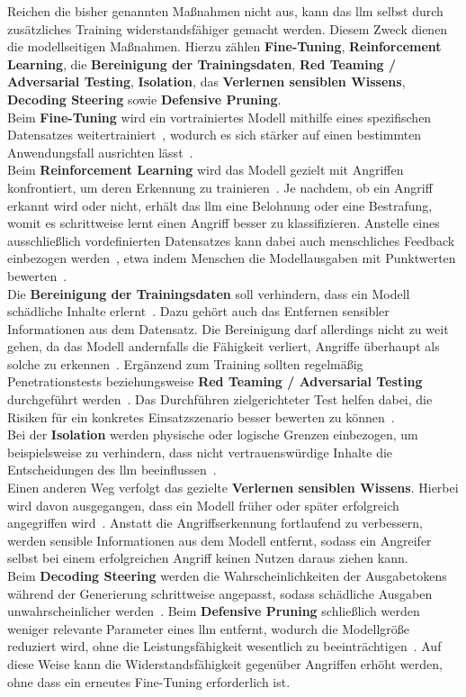 Reichen die bisher genannten Maßnahmen nicht aus, kann das \ac{llm} selbst durch zusätzliches Training widerstandsfähiger gemacht werden. Diesem Zweck dienen die
modellseitigen Maßnahmen. Hierzu zählen \textbf{Fine-Tuning}, \textbf{Reinforcement Learning}, die \textbf{Bereinigung der Trainingsdaten}, \textbf{Red Teaming / Adversarial Testing},
\textbf{Isolation}, das \textbf{Verlernen sensiblen Wissens}, \textbf{Decoding Steering} sowie \textbf{Defensive Pruning}. \\
Beim \textbf{Fine-Tuning} wird ein vortrainiertes Modell mithilfe eines spezifischen Datensatzes weitertrainiert~\cite{sm14}, wodurch es sich stärker auf einen bestimmten
Anwendungsfall ausrichten lässt~\cite[7]{sm09}. \\
Beim \textbf{Reinforcement Learning} wird das Modell gezielt mit Angriffen konfrontiert, um deren Erkennung zu trainieren~\cite{sm07}. Je nachdem, ob ein Angriff erkannt wird
oder nicht, erhält das \ac{llm} eine Belohnung oder eine Bestrafung, womit es schrittweise lernt einen Angriff besser zu klassifizieren.
Anstelle eines ausschließlich vordefinierten Datensatzes kann dabei auch menschliches Feedback
einbezogen werden~\cite{sm04}, etwa indem Menschen die Modellausgaben mit Punktwerten bewerten~\cite[8]{sm10}. \\
Die \textbf{Bereinigung der Trainingsdaten} soll verhindern, dass ein Modell schädliche Inhalte erlernt~\cite{pi14}. Dazu gehört auch das Entfernen sensibler Informationen aus
dem Datensatz. Die Bereinigung darf allerdings nicht zu weit gehen, da das Modell andernfalls die Fähigkeit verliert, Angriffe überhaupt als solche zu erkennen~\cite[13]{sm10}.
Ergänzend zum Training sollten regelmäßig Penetrationstests beziehungsweise \textbf{Red Teaming / Adversarial Testing} durchgeführt werden~\cite[4]{sm08}\cite{pi15}. 
Das Durchführen zielgerichteter Test helfen dabei, die Risiken für ein konkretes Einsatzszenario besser bewerten zu können~\cite[4]{sm08}. \\
Bei der \textbf{Isolation} werden physische oder logische Grenzen einbezogen, um beispielsweise zu verhindern, dass nicht vertrauenswürdige Inhalte die Entscheidungen des \ac{llm}
beeinflussen~\cite[8]{sm09}. \\
Einen anderen Weg verfolgt das gezielte \textbf{Verlernen sensiblen Wissens}. Hierbei wird davon ausgegangen, dass ein Modell früher oder später erfolgreich angegriffen wird~\cite[8]{sm10}.
Anstatt die Angriffserkennung fortlaufend zu verbessern, werden sensible Informationen aus dem Modell entfernt, sodass ein Angreifer selbst bei einem erfolgreichen Angriff
keinen Nutzen daraus ziehen kann. \\
Beim \textbf{Decoding Steering} werden die Wahrscheinlichkeiten der Ausgabetokens während der Generierung schrittweise angepasst, sodass schädliche Ausgaben unwahrscheinlicher
werden~\cite[11]{sm10}. Beim \textbf{Defensive Pruning} schließlich werden weniger relevante Parameter eines \ac{llm} entfernt, wodurch die Modellgröße reduziert wird, ohne die
Leistungsfähigkeit wesentlich zu beeinträchtigen~\cite[11]{sm10}. Auf diese Weise kann die Widerstandsfähigkeit gegenüber Angriffen erhöht werden, ohne dass ein
erneutes Fine-Tuning erforderlich ist.

